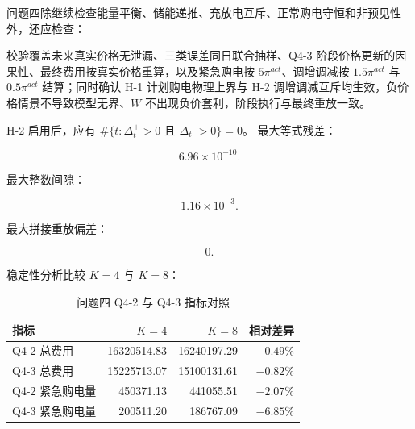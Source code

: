 问题四除继续检查能量平衡、储能递推、充放电互斥、正常购电守恒和非预见性外，还应检查：

校验覆盖未来真实价格无泄漏、三类误差同日联合抽样、Q4-3 阶段价格更新的因果性、最终费用按真实价格重算，以及紧急购电按 \(5\pi^{act}\)、调增调减按 \(1.5\pi^{act}\) 与 \(0.5\pi^{act}\) 结算；同时确认 H-1 计划购电物理上界与 H-2 调增调减互斥均生效，负价格情景不导致模型无界、\(W\) 不出现负价套利，阶段执行与最终重放一致。

H-2 启用后，应有 \(\#\{t:\Delta_t^+>0\text{ 且 }\Delta_t^->0\}=0\)。 最大等式残差：

\[
6.96\times10^{-10}.
\]

最大整数间隙：

\[
1.16\times10^{-3}.
\]

最大拼接重放偏差：

\[
0.
\]

稳定性分析比较 \(K=4\) 与 \(K=8\)：

\begin{table}[H]
\centering
{}
\begin{tabular}{lrrr}
\toprule
指标 & \(K=4\) & \(K=8\) & 相对差异 \\
\midrule
Q4-2 总费用 & 16320514.83 & 16240197.29 & $-0.49\%$ \\
Q4-3 总费用 & 15225713.07 & 15100131.61 & $-0.82\%$ \\
Q4-2 紧急购电量 & 450371.13 & 441055.51 & $-2.07\%$ \\
Q4-3 紧急购电量 & 200511.20 & 186767.09 & $-6.85\%$ \\
\bottomrule
\end{tabular}
\caption{问题四 Q4-2 与 Q4-3 指标对照}
\label{tab:13}
\end{table}

